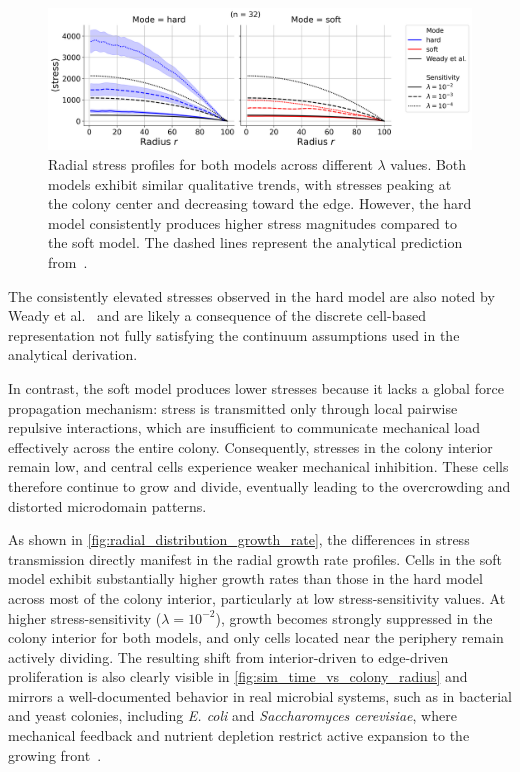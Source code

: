 \documentclass[conference]{IEEEtran}
\begin{document}
\begin{figure}[b]
    \centering
    \includegraphics[width=\linewidth]{figures/comparison_plots/combined_stress_shared.png}
    \caption{Radial stress profiles for both models across different $\lambda$ values. Both models exhibit similar qualitative trends, with stresses peaking at the colony center and decreasing toward the edge. However, the hard model consistently produces higher stress magnitudes compared to the soft model. The dashed lines represent the analytical prediction from~\cite{Weady2024SM}.}
    \label{fig:radial_distribution_stress}
\end{figure}

The consistently elevated stresses observed in the hard model are also noted by Weady et al.~\cite{Weady2024} and are likely a consequence of the discrete cell-based representation not fully satisfying the continuum assumptions used in the analytical derivation.

In contrast, the soft model produces lower stresses because it lacks a global force propagation mechanism: stress is transmitted only through local pairwise repulsive interactions, which are insufficient to communicate mechanical load effectively across the entire colony. Consequently, stresses in the colony interior remain low, and central cells experience weaker mechanical inhibition. These cells therefore continue to grow and divide, eventually leading to the overcrowding and distorted microdomain patterns.

As shown in \autoref{fig:radial_distribution_growth_rate}, the differences in stress transmission directly manifest in the radial growth rate profiles. Cells in the soft model exhibit substantially higher growth rates than those in the hard model across most of the colony interior, particularly at low stress-sensitivity values. At higher stress-sensitivity ($\lambda = 10^{-2}$), growth becomes strongly suppressed in the colony interior for both models, and only cells located near the periphery remain actively dividing. The resulting shift from interior-driven to edge-driven proliferation is also clearly visible in \autoref{fig:sim_time_vs_colony_radius} and mirrors a well-documented behavior in real microbial systems, such as in bacterial and yeast colonies, including \textit{E. coli} and \textit{Saccharomyces cerevisiae}, where mechanical feedback and nutrient depletion restrict active expansion to the growing front~\cite{Warren2019,Hallatschek2007,Giometto2018}.
\end{document}
